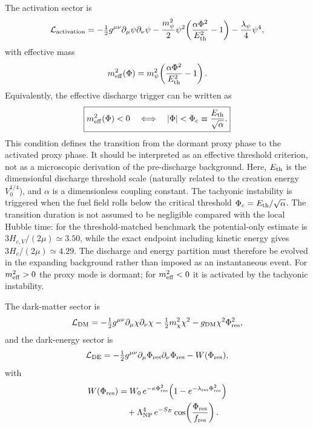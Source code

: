 \documentclass[epj]{svjour}
\begin{document}
The activation sector is
\begin{equation}
\mathcal{L}_{\rm activation}
=-\tfrac{1}{2}g^{\mu\nu}\partial_\mu\psi\partial_\nu\psi
-\frac{m_\psi^2}{2}\psi^2\!\left(\frac{\alpha\Phi^2}{E_{\rm th}^2}-1\right)
-\frac{\lambda_\psi}{4}\psi^4,
\label{eq:lact}
\end{equation}
with effective mass
\begin{equation}
m_{\rm eff}^2(\Phi)
=m_\psi^2\!\left(\frac{\alpha\Phi^2}{E_{\rm th}^2}-1\right).
\end{equation}
Equivalently, the effective discharge trigger can be written as
\begin{equation}
\boxed{
 m_{\rm eff}^2(\Phi)<0
 \quad\Longleftrightarrow\quad
 |\Phi|<\Phi_c\equiv \frac{E_{\rm th}}{\sqrt{\alpha}} .
}
\label{eq:ptum_threshold_box}
\end{equation}
This condition defines the transition from the dormant proxy phase to the
activated proxy phase. It should be interpreted as an effective threshold
criterion, not as a microscopic derivation of the pre-discharge background.
Here, $E_{\rm th}$ is the dimensionful discharge threshold scale (naturally related to the creation energy $V_0^{1/4}$), and $\alpha$ is a dimensionless coupling constant. The tachyonic instability is triggered when the fuel field rolls below the critical threshold $\Phi_c=E_{\rm th}/\sqrt{\alpha}$. The transition duration is not assumed to be negligible compared with the local Hubble time: for the threshold-matched benchmark the potential-only estimate is $3H_{c,V}/(2\mu)\simeq3.50$, while the exact endpoint including kinetic energy gives $3H_c/(2\mu)\simeq4.29$. The discharge and energy partition must therefore be evolved in the expanding background rather than imposed as an instantaneous event. For \(m_{\rm eff}^2>0\) the proxy mode is dormant; for \(m_{\rm eff}^2<0\) it is activated by the tachyonic instability.

The dark-matter sector is
\begin{equation}
\mathcal{L}_{\rm DM}
=-\tfrac{1}{2}g^{\mu\nu}\partial_\mu\chi\partial_\nu\chi
-\tfrac{1}{2}m_\chi^2\chi^2
-g_{\rm DM}\chi^2\Phi_{\rm res}^2,
\end{equation}
and the dark-energy sector is
\begin{equation}
\mathcal{L}_{\rm DE}
=-\tfrac{1}{2}g^{\mu\nu}\partial_\mu\Phi_{\rm res}\partial_\nu\Phi_{\rm res}
-W(\Phi_{\rm res}),
\end{equation}
with
\begin{equation}
\begin{split}
W(\Phi_{\rm res})
&=W_0\,e^{-\kappa\Phi_{\rm res}^2}
\!\left(1-e^{-\lambda_{\rm res}\Phi_{\rm res}^2}\right) \\
&\quad +\Lambda_{\rm NP}^4\,e^{-S_E}
\cos\!\left(\frac{\Phi_{\rm res}}{f_{\rm res}}\right).
\end{split}
\label{eq:wpot}
\end{equation}
\end{document}
